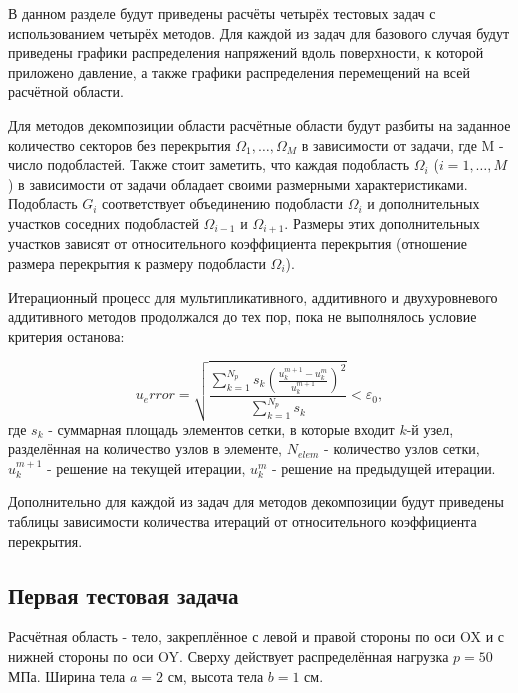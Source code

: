 \documentclass[a4paper]{article}
\begin{document}
В данном разделе будут приведены расчёты четырёх тестовых задач с использованием четырёх методов. Для каждой из задач для базового случая будут приведены графики распределения напряжений вдоль поверхности, к которой приложено давление, а также графики распределения перемещений на всей расчётной области.

Для методов декомпозиции области расчётные области будут разбиты на заданное количество секторов без перекрытия $\Omega_1, \ldots, \Omega_M$ в зависимости от задачи, где M - число подобластей. Также стоит заметить, что каждая подобласть $\Omega_i$ ($i = 1,\ldots,M$) в зависимости от задачи обладает своими размерными характеристиками. Подобласть $G_i$ соответствует объединению подобласти $\Omega_i$ и дополнительных участков соседних подобластей $\Omega_{i-1}$ и $\Omega_{i+1}$. Размеры этих дополнительных участков зависят от относительного коэффициента перекрытия (отношение размера перекрытия к размеру подобласти $\Omega_i$).

Итерационный процесс для мультипликативного, аддитивного и двухуровневого аддитивного методов продолжался до тех пор, пока не выполнялось условие критерия останова:

\begin{equation}
u_error = \sqrt{\frac{\sum_{k = 1}^{N_{p}} s_k \left(\frac{u_{k}^{m+1} - u_{k}^{m}}{u_{k}^{m+1}} \right)^2}{\sum_{k = 1}^{N_{p}} s_k}} < \varepsilon_0,
\end{equation}
где $s_k$ - суммарная площадь элементов сетки, в которые входит $k$-й узел, разделённая на количество узлов в элементе, $N_{elem}$ - количество узлов сетки, $u_{k}^{m+1}$ - решение на текущей итерации, $u_{k}^{m}$ - решение на предыдущей итерации.

Дополнительно для каждой из задач для методов декомпозиции будут приведены таблицы зависимости количества итераций от относительного коэффициента перекрытия.

\subsection{Первая тестовая задача}

Расчётная область - тело, закреплённое с левой и правой стороны по оси OX и с нижней стороны по оси OY. Сверху действует распределённая нагрузка $p = 50$ МПа. Ширина тела $a = 2$ см, высота тела $b = 1$ см. 
\end{document}
